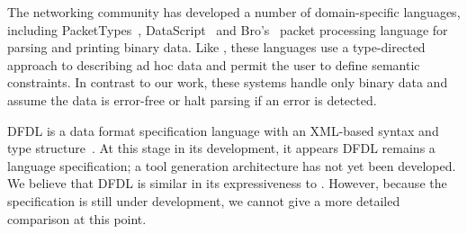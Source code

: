 



The networking community has developed a number of domain-specific
languages, including PacketTypes~\cite{sigcomm00}, DataScript~\cite{gpce02}
and Bro's~\cite{paxson:bro} packet processing language
for parsing and printing binary data.  
Like \padsml{}, these languages use a type-directed
approach to describing ad hoc data and permit the user to define
semantic constraints.  In contrast to our work, these systems handle
only binary data and assume the data is error-free or halt parsing if
an error is detected. 

DFDL is a data format specification language with an XML-based syntax
and type structure~\cite{dfdl-proposal,dfdl-primer}. At this stage in
its development, it appears DFDL remains a language specification; a
tool generation architecture has not yet been developed. We believe
that DFDL is similar in its expressiveness to \padsc{}.  However,
because the specification is still under development, we cannot give a
more detailed comparison at this point.

